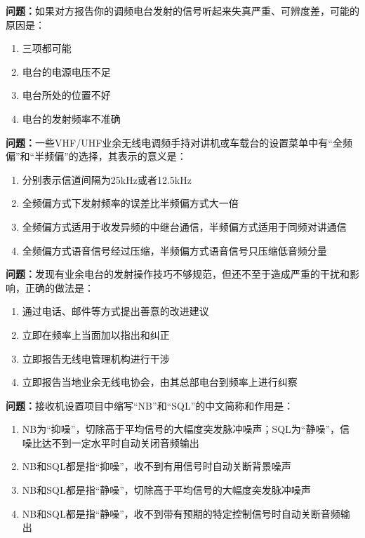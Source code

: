 \noindent\textbf{问题：}如果对方报告你的调频电台发射的信号听起来失真严重、可辨度差，可能的原因是：
\begin{enumerate}[label=\Alph*), leftmargin=3em]
\item 三项都可能
\item 电台的电源电压不足
\item 电台所处的位置不好
\item 电台的发射频率不准确
\end{enumerate}

\bigskip


\noindent\textbf{问题：}一些VHF/UHF业余无线电调频手持对讲机或车载台的设置菜单中有“全频偏”和“半频偏”的选择，其表示的意义是：
\begin{enumerate}[label=\Alph*), leftmargin=3em]
\item 分别表示信道间隔为25kHz或者12.5kHz
\item 全频偏方式下发射频率的误差比半频偏方式大一倍
\item 全频偏方式适用于收发异频的中继台通信，半频偏方式适用于同频对讲通信
\item 全频偏方式语音信号经过压缩，半频偏方式语音信号只压缩低音频分量
\end{enumerate}

\bigskip


\noindent\textbf{问题：}发现有业余电台的发射操作技巧不够规范，但还不至于造成严重的干扰和影响，正确的做法是：
\begin{enumerate}[label=\Alph*), leftmargin=3em]
\item 通过电话、邮件等方式提出善意的改进建议
\item 立即在频率上当面加以指出和纠正
\item 立即报告无线电管理机构进行干涉
\item 立即报告当地业余无线电协会，由其总部电台到频率上进行纠察
\end{enumerate}

\bigskip


\noindent\textbf{问题：}接收机设置项目中缩写“NB”和“SQL”的中文简称和作用是：
\begin{enumerate}[label=\Alph*), leftmargin=3em]
\item NB为“抑噪”，切除高于平均信号的大幅度突发脉冲噪声；SQL为“静噪”，信噪比达不到一定水平时自动关闭音频输出
\item NB和SQL都是指“抑噪”，收不到有用信号时自动关断背景噪声
\item NB和SQL都是指“静噪”，切除高于平均信号的大幅度突发脉冲噪声
\item NB和SQL都是指“静噪”，收不到带有预期的特定控制信号时自动关断音频输出
\end{enumerate}

